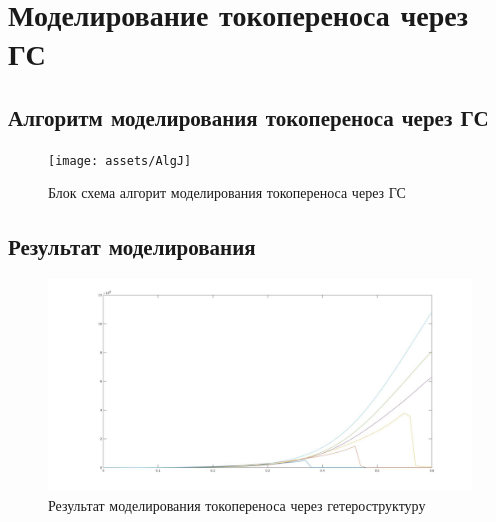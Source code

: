 \section{Моделирование токопереноса через ГС}
\subsection{Алгоритм моделирования токопереноса через ГС}
\begin{figure}[h]
  \centering
  \texttt{[image: assets/AlgJ]}
  \caption{Блок схема алгорит моделирования токопереноса через ГС}
  \label{img:AlgJ}
\end{figure}

\subsection{Результат моделирования}
\begin{figure}[h]
  \centering
  \includegraphics[width=1.1\linewidth]{assets/degrI25}
  \caption{Результат моделирования токопереноса через гетероструктуру}
  \label{img:degrI25}
\end{figure}
